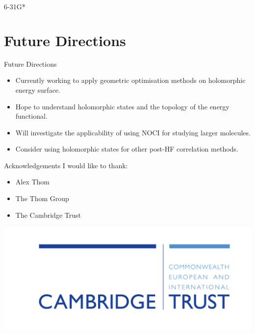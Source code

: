 \documentclass{beamer}
\begin{document}
\begin{frame}{ 6-31G*}
 \vspace{-1em}
 \begin{center}

 \end{center}
\end{frame} 

\section{Future Directions}
\begin{frame}{Future Directions}
 \begin{itemize}
  \item<1->{Currently working to apply geometric optimisation methods on holomorphic energy surface.}
  \item<2->{Hope to understand holomorphic states and the topology of the energy functional.}
  \item<3->{Will investigate the applicability of using NOCI for studying larger molecules.}
  \item<4->{Consider using holomorphic states for other post-HF correlation methods.}
 \end{itemize}
\end{frame}

\begin{frame}{Acknowledgements}
 I would like to thank:
 
 \begin{itemize}
  \item{Alex Thom}
  \item{The Thom Group}
  \item{The Cambridge Trust}
 \end{itemize}
 \begin{center}
  \includegraphics[scale=0.7]{template/CT_logo.jpg}
 \end{center}
\end{frame}
\end{document}
